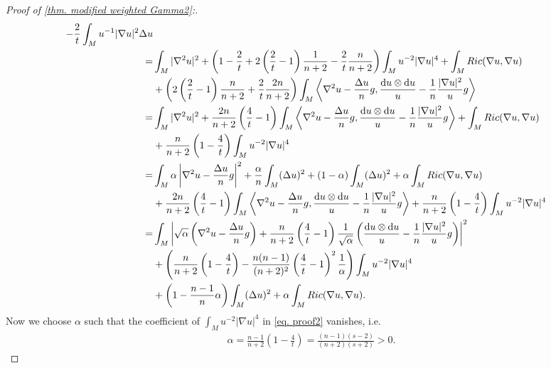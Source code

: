 \documentclass[11pt]{amsart}
\numberwithin{equation}{section}
\numberwithin{lemma}{section}
\numberwithin{proposition}{section}
\numberwithin{corollary}{section}
\numberwithin{remark}{section}
\newcommand{\dd}{\mathop{}\!\mathrm{d}}%
\begin{document}
\begin{proof}[Proof of \cref{thm. modified weighted Gamma2}:]
\begin{align}
     -\frac{2}{t}\int_M
     u^{-1}|\nabla u|^2\Delta u
     \notag\\
     =&\int_M |\nabla^2 u|^2
     +\left(1-\frac{2}{t}+2\left(\frac{2}{t}-1\right)\frac{1}{n+2}
     -\frac{2}{t}\frac{n}{n+2}\right)\int_M
     u^{-2}|\nabla u|^4
     +\int_M Ric(\nabla u,\nabla u)\notag\\
     &+\left(
     2\left(\frac{2}{t}-1\right)\frac{n}{n+2}
     +\frac{2}{t}\frac{2n}{n+2}
     \right)\int_M
     \left\langle\nabla^2 u-\frac{\Delta u}{n}g,\frac{\dd u\otimes \dd u}{u}-\frac{1}{n}\frac{|\nabla u|^2}{u}g\right\rangle
     \notag\\
     =&\int_M |\nabla^2 u|^2
     +\frac{2n}{n+2}\left(\frac{4}{t}-1\right)\int_M
     \left\langle\nabla^2 u-\frac{\Delta u}{n}g,\frac{\dd u\otimes \dd u}{u}-\frac{1}{n}\frac{|\nabla u|^2}{u}g\right\rangle
     +\int_M Ric(\nabla u,\nabla u)
     \notag\\
     &+\frac{n}{n+2}\left(1-\frac{4}{t}\right)\int_M
     u^{-2}|\nabla u|^4
     \notag\\
     =&\int_M \alpha\left|\nabla^2 u-\frac{\Delta u}{n}g\right|^2
     +\frac{\alpha}{n}\int_M
     (\Delta u)^2
     +(1-\alpha)\int_M
     (\Delta u)^2
     +\alpha \int_M Ric(\nabla u,\nabla u)\notag\\
     &+\frac{2n}{n+2}\left(\frac{4}{t}-1\right)\int_M
     \left\langle\nabla^2 u-\frac{\Delta u}{n}g,\frac{\dd u\otimes \dd u}{u}-\frac{1}{n}\frac{|\nabla u|^2}{u}g\right\rangle
     +\frac{n}{n+2}\left(1-\frac{4}{t}\right)
     \int_M u^{-2}|\nabla u|^4\notag\\
     =&\int_M \left|\sqrt{\alpha}
     \left(\nabla^2 u-\frac{\Delta u}{n}g\right)
     +\frac{n}{n+2}\left(\frac{4}{t}-1\right)\frac{1}{\sqrt{\alpha}}
     \left(\frac{\dd u\otimes \dd u}{u}-\frac{1}{n}\frac{|\nabla u|^2}{u}g\right)\right|^2
     \notag\\
     &+\left(
     \frac{n}{n+2}\left(1-\frac{4}{t}\right)
     -\frac{n(n-1)}{(n+2)^2}\left(\frac{4}{t}-1\right)^2\frac{1}{\alpha}
     \right)
     \int_M u^{-2}|\nabla u|^4\notag
     \\
     &+\left(1-\frac{n-1}{n}\alpha\right)
     \int_M (\Delta u)^2
     +\alpha \int_M Ric(\nabla u,\nabla u).\label{eq. proof2}
 \end{align}
 Now we choose $\alpha$ such that the coefficient of $\int_M u^{-2}|\nabla u|^4$ in \cref{eq. proof2} vanishes, i.e.
 \begin{align*}
     \alpha=\frac{n-1}{n+2}\left(1-\frac{4}{t}\right)
     =\frac{(n-1)(s-2)}{(n+2)(s+2)}>0.

\end{align*}
\end{proof}
\end{document}
